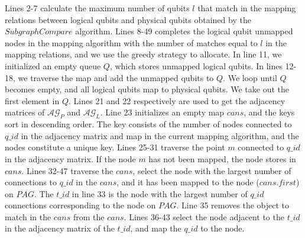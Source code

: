 \documentclass[runningheads]{llncs}
\begin{document}
Lines 2-7 calculate the maximum number of qubits $l$ that match in the mapping relations between logical qubits and physical qubits obtained by the $SubgraphCompare$ algorithm. Lines 8-49 completes the logical qubit unmapped nodes in the mapping algorithm with the number of matches equal to $l$ in the mapping relations, and we use the greedy strategy to allocate. In line 11, we initialized an empty queue $Q$, which stores unmapped logical qubits. In lines 12-18, we traverse the map and add the unmapped qubits to $Q$. We loop until $Q$ becomes empty, and all logical qubits map to physical qubits. We take out the first element in $Q$. Lines 21 and 22 respectively are used to get the adjacency matrices of $\mathcal{AG}_{P}$ and $\mathcal{AG}_{L}$. Line 23 initializes an empty map $cans$, and the keys sort in descending order. The key consists of the number of nodes connected to $q\_id$ in the adjacency matrix and map in the current mapping algorithm, and the nodes constitute a unique key. Lines 25-31 traverse the point $m$ connected to $q\_id$ in the adjacency matrix. If the node $m$ has not been mapped, the node stores in $cans$. Lines 32-47 traverse the $cans$, select the node with the largest number of connections to $q\_id$ in the $cans$, and it has been mapped to the node ($cans.first$) on $PAG$. The $t\_id$ in line 33 is the node with the largest number of $q\_id$ connections corresponding to the node on $PAG$. Line 35  removes the object to match in the $cans$ from the $cans$. Lines 36-43  select the node adjacent to the $t\_id$ in the adjacency matrix of the $t\_id$, and map the $q\_id$ to the node.
\end{document}
